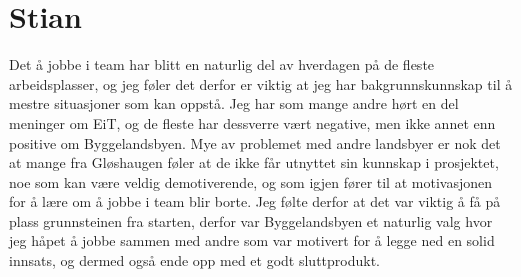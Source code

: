 \section{Stian}
Det å jobbe i team har blitt en naturlig del av hverdagen på de fleste arbeidsplasser, 
og jeg føler det derfor er viktig at jeg har bakgrunnskunnskap til å mestre situasjoner som kan oppstå. 
Jeg har som mange andre hørt en del meninger om EiT, og de fleste har dessverre vært negative, 
men ikke annet enn positive om Byggelandsbyen. 
Mye av problemet med andre landsbyer er nok det at mange fra Gløshaugen føler at de ikke får utnyttet sin kunnskap i prosjektet, 
noe som kan være veldig demotiverende, og som igjen fører til at motivasjonen for å lære om å jobbe i team blir borte. 
Jeg følte derfor at det var viktig å få  på plass grunnsteinen fra starten, 
derfor var Byggelandsbyen et naturlig valg hvor jeg håpet å jobbe sammen med andre som var motivert for å legge ned en solid innsats, 
og dermed også ende opp med et godt sluttprodukt.   